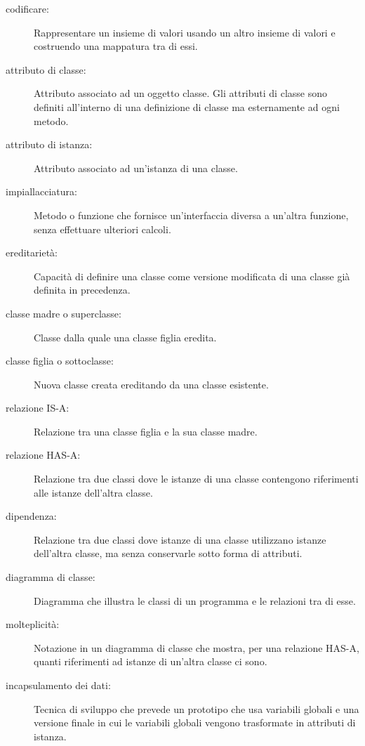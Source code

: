 \documentclass[10pt]{book}
\begin{document}
\begin{description}

\item[codificare:]  Rappresentare un insieme di valori usando un altro insieme di valori e costruendo una mappatura tra di essi.

\item[attributo di classe:] Attributo associato ad un oggetto classe. Gli attributi di classe sono definiti all'interno di una definizione di classe ma esternamente ad ogni metodo.

\item[attributo di istanza:] Attributo associato ad un'istanza di una classe.

\item[impiallacciatura:] Metodo o funzione che fornisce un'interfaccia diversa a un'altra funzione, senza effettuare ulteriori calcoli.

\item[ereditarietà:] Capacità di definire una classe come versione modificata di una classe già definita in precedenza.

\item[classe madre o superclasse:] Classe dalla quale una classe figlia eredita.

\item[classe figlia o sottoclasse:] Nuova classe creata ereditando da una classe esistente.

\item[relazione IS-A:] Relazione tra una classe figlia e la sua classe madre.

\item[relazione HAS-A:] Relazione tra due classi dove le istanze di una classe contengono riferimenti alle istanze dell'altra classe.

\item[dipendenza:] Relazione tra due classi dove istanze di una classe utilizzano istanze dell'altra classe, ma senza conservarle sotto forma di attributi.

\item[diagramma di classe:] Diagramma che illustra le classi di un programma e le relazioni tra di esse.

\item[molteplicità:] Notazione in un diagramma di classe che mostra, per una relazione HAS-A, quanti riferimenti ad istanze di un'altra classe ci sono.

\item[incapsulamento dei dati:] Tecnica di sviluppo che prevede un prototipo che usa variabili globali e una versione finale in cui le variabili globali vengono trasformate in attributi di istanza.

\end{description}
\end{document}
